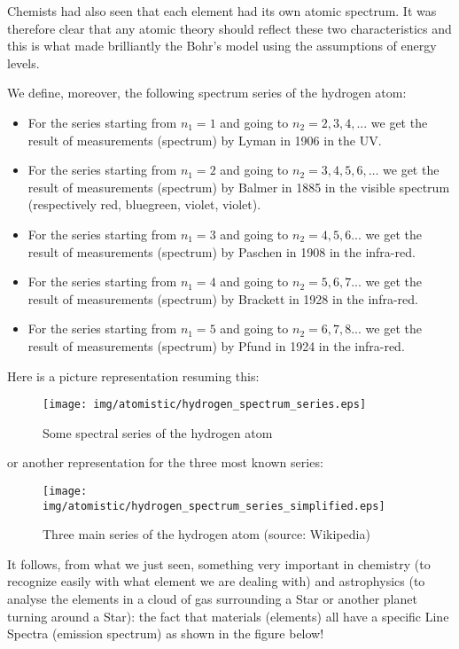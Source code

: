 Chemists had also seen that each element had its own atomic spectrum. It was therefore clear that any atomic theory should reflect these two characteristics and this is what made brilliantly the Bohr's model using the assumptions of energy levels.

We define, moreover, the following spectrum series of the hydrogen atom:

	\begin{itemize}
		\item For the series starting from $n_1=1$ and going to $n_2=2,3,4,...$  we get the result of measurements (spectrum) by Lyman in 1906 in the UV.
		
		\item For the series starting from $n_1=2$ and going to $n_2=3,4,5,6,\ldots$  we get the result of measurements (spectrum) by Balmer in 1885 in the visible spectrum (respectively red, bluegreen, violet, violet).
		
		\item For the series starting from $n_1=3$ and going to $n_2=4,5,6...$  we get the result of measurements (spectrum) by Paschen in 1908 in the infra-red.
		
		\item For the series starting from $n_1=4$ and going to $n_2=5,6,7...$  we get the result of measurements (spectrum) by Brackett in 1928 in the infra-red.
		
		\item For the series starting from $n_1=5$ and going to $n_2=6,7,8...$  we get the result of measurements (spectrum) by Pfund in 1924 in the infra-red.
	\end{itemize}
	Here is a picture representation resuming this:
	\begin{figure}[H]
		\centering
		\texttt{[image: img/atomistic/hydrogen\_spectrum\_series.eps]}
		\caption{Some spectral series of the hydrogen atom}
	\end{figure}
	or another representation for the three most known series:
	\begin{figure}[H]
		\centering
		\texttt{[image: img/atomistic/hydrogen\_spectrum\_series\_simplified.eps]}
		\caption[Three main series of the hydrogen atom]{Three main series of the hydrogen atom (source: Wikipedia)}
	\end{figure}
	It follows, from what we just seen, something very important in chemistry (to recognize easily with what element we are dealing with) and astrophysics (to analyse the elements in a cloud of gas surrounding a Star or another planet turning around a Star): the fact that materials (elements) all have a specific Line Spectra (emission spectrum) as shown in the figure below!
